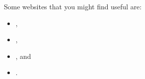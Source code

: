 \endhsection%
%
%
Some websites that you might find useful are:%
\begin{itemize}%
\item {},%
\item {},%
\item {}, and%
\item {}.%
\end{itemize}%
\endhsection%
%
\global\let\glslink\oldxyzglslink%
\endhsection%
%

